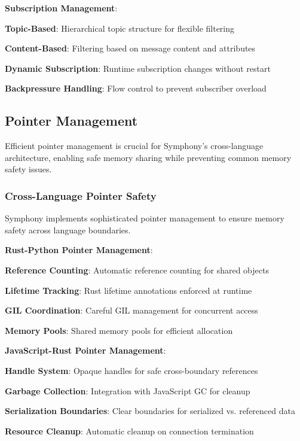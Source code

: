 \textbf{Subscription Management}:
\begin{compactlist}
    \item \textbf{Topic-Based}: Hierarchical topic structure for flexible filtering
    \item \textbf{Content-Based}: Filtering based on message content and attributes
    \item \textbf{Dynamic Subscription}: Runtime subscription changes without restart
    \item \textbf{Backpressure Handling}: Flow control to prevent subscriber overload
\end{compactlist}

\subsection*{Pointer Management}

Efficient pointer management is crucial for Symphony's cross-language architecture, enabling safe memory sharing while preventing common memory safety issues.

\subsubsection*{Cross-Language Pointer Safety}

Symphony implements sophisticated pointer management to ensure memory safety across language boundaries.

\textbf{Rust-Python Pointer Management}:
\begin{compactlist}
    \item \textbf{Reference Counting}: Automatic reference counting for shared objects
    \item \textbf{Lifetime Tracking}: Rust lifetime annotations enforced at runtime
    \item \textbf{GIL Coordination}: Careful GIL management for concurrent access
    \item \textbf{Memory Pools}: Shared memory pools for efficient allocation
\end{compactlist}

\textbf{JavaScript-Rust Pointer Management}:
\begin{compactlist}
    \item \textbf{Handle System}: Opaque handles for safe cross-boundary references
    \item \textbf{Garbage Collection}: Integration with JavaScript GC for cleanup
    \item \textbf{Serialization Boundaries}: Clear boundaries for serialized vs. referenced data
    \item \textbf{Resource Cleanup}: Automatic cleanup on connection termination
\end{compactlist}

